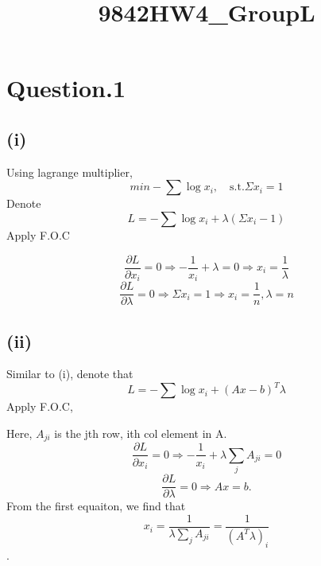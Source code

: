 \documentclass[11pt]{article}
\title{9842HW4\_GroupL}
\begin{document}
    
    
    \maketitle
    
    

    
    \section{Question.1}\label{question.1}

    \subsection{(i)}\label{i}

Using lagrange multiplier, \[
min - \sum \log x_i, \quad \text{s.t.} \Sigma x_i = 1
\] Denote \[
L = - \sum \log x_i + \lambda(\Sigma x_i - 1)
\] Apply F.O.C

\[
\frac{\partial L}{\partial x_i} = 0 \Rightarrow -\frac{1}{x_i} + \lambda = 0 \Rightarrow x_i = \frac 1\lambda
\] \[
\frac{\partial L}{\partial \lambda} = 0 \Rightarrow \Sigma x_i = 1 \Rightarrow x_i = \frac 1n, \lambda = n
\]

    \subsection{(ii)}\label{ii}

Similar to (i), denote that \[
L = -\sum\log x_i + (Ax - b)^T\lambda
\] Apply F.O.C,

Here, \(A_{ji}\) is the jth row, ith col element in A. \[
\frac{\partial L}{\partial x_i} = 0 \Rightarrow  -\frac{1}{x_i} + \lambda\sum_j A_{ji} = 0
\] \[
\frac{\partial L}{\partial\lambda} = 0 \Rightarrow Ax = b.
\] From the first equaiton, we find that
\[x_i = \frac{1}{\lambda\sum_jA_{ji}} = \frac{1}{(A^T\lambda)_i}\].
\end{document}

